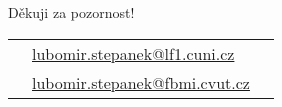 \documentclass[t, compress]{beamer}
\begin{document}
{
\miniframesoff
\begin{frame}
\frametitle{}
  \vspace{+1.6cm}
  \begin{block}{\centering Děkuji za pozornost!}
    \center
    \begin{tabular}{l@{}l@{}l}
      &\href{mailto:lubomir.stepanek@lf1.cuni.cz}{%
        lubomir.stepanek@lf1.cuni.cz%
      } \\
      &\href{mailto:lubomir.stepanek@fbmi.cvut.cz}{%
        lubomir.stepanek@fbmi.cvut.cz%
      }
    \end{tabular}
  \end{block}
  \vspace{+0.8cm}
  \begin{center}
    
    \href{http://shiny.statest.cz:3838/statisticke\_nastroje/}{%
    }
    
  \end{center}
\end{frame}
\miniframeson
}


\end{document}
